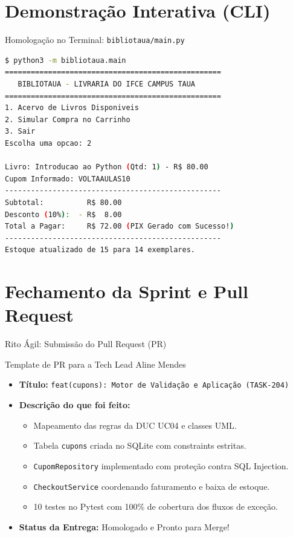 \documentclass[10pt]{beamer}
\begin{document}
\section{Demonstração Interativa (CLI)}

\begin{frame}[fragile]{Homologação no Terminal: \texttt{bibliotaua/main.py}}
\begin{lstlisting}[language=bash]
$ python3 -m bibliotaua.main
==================================================
   BIBLIOTAUA - LIVRARIA DO IFCE CAMPUS TAUA
==================================================
1. Acervo de Livros Disponiveis
2. Simular Compra no Carrinho
3. Sair
Escolha uma opcao: 2

Livro: Introducao ao Python (Qtd: 1) - R$ 80.00
Cupom Informado: VOLTAAULAS10
--------------------------------------------------
Subtotal:          R$ 80.00
Desconto (10%):  - R$  8.00
Total a Pagar:     R$ 72.00 (PIX Gerado com Sucesso!)
--------------------------------------------------
Estoque atualizado de 15 para 14 exemplares.
\end{lstlisting}
\end{frame}

\section{Fechamento da Sprint e Pull Request}

\begin{frame}{Rito Ágil: Submissão do Pull Request (PR)}
    \begin{block}{Template de PR para a Tech Lead Aline Mendes}
    \begin{itemize}
        \item \textbf{Título:} \texttt{feat(cupons): Motor de Validação e Aplicação (TASK-204)}
        \item \textbf{Descrição do que foi feito:}
        \begin{itemize}
            \item Mapeamento das regras da DUC UC04 e classes UML.
            \item Tabela \texttt{cupons} criada no SQLite com constraints estritas.
            \item \texttt{CupomRepository} implementado com proteção contra SQL Injection.
            \item \texttt{CheckoutService} coordenando faturamento e baixa de estoque.
            \item 10 testes no Pytest com 100\% de cobertura dos fluxos de exceção.
        \end{itemize}
        \item \textbf{Status da Entrega:} Homologado e Pronto para Merge!
    \end{itemize}
    \end{block}
\end{frame}
\end{document}
